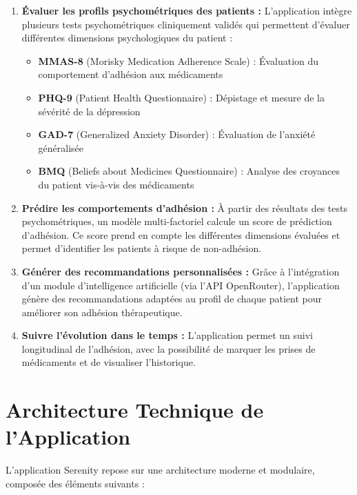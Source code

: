 \documentclass[12pt,a4paper]{report}
\begin{document}
\begin{enumerate}
    \item \textbf{Évaluer les profils psychométriques des patients :} L'application intègre plusieurs tests psychométriques cliniquement validés qui permettent d'évaluer différentes dimensions psychologiques du patient :
    \begin{itemize}
        \item \textbf{MMAS-8} (Morisky Medication Adherence Scale) : Évaluation du comportement d'adhésion aux médicaments
        \item \textbf{PHQ-9} (Patient Health Questionnaire) : Dépistage et mesure de la sévérité de la dépression
        \item \textbf{GAD-7} (Generalized Anxiety Disorder) : Évaluation de l'anxiété généralisée
        \item \textbf{BMQ} (Beliefs about Medicines Questionnaire) : Analyse des croyances du patient vis-à-vis des médicaments
    \end{itemize}
    
    \item \textbf{Prédire les comportements d'adhésion :} À partir des résultats des tests psychométriques, un modèle multi-factoriel calcule un score de prédiction d'adhésion. Ce score prend en compte les différentes dimensions évaluées et permet d'identifier les patients à risque de non-adhésion.
    
    \item \textbf{Générer des recommandations personnalisées :} Grâce à l'intégration d'un module d'intelligence artificielle (via l'API OpenRouter), l'application génère des recommandations adaptées au profil de chaque patient pour améliorer son adhésion thérapeutique.
    
    \item \textbf{Suivre l'évolution dans le temps :} L'application permet un suivi longitudinal de l'adhésion, avec la possibilité de marquer les prises de médicaments et de visualiser l'historique.
\end{enumerate}

\section{Architecture Technique de l'Application}

L'application Serenity repose sur une architecture moderne et modulaire, composée des éléments suivants :
\end{document}
